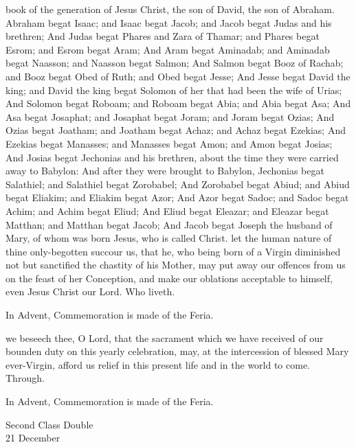  book of the generation of Jesus Christ, the son of David, the son of Abraham. Abraham begat Isaac; and Isaac begat Jacob; and Jacob begat Judas and his brethren; And Judas begat Phares and Zara of Thamar; and Phares begat Esrom; and Esrom begat Aram; And Aram begat Aminadab; and Aminadab begat Naasson; and Naasson begat Salmon; And Salmon begat Booz of Rachab; and Booz begat Obed of Ruth; and Obed begat Jesse; And Jesse begat David the king; and David the king begat Solomon of her that had been the wife of Urias; And Solomon begat Roboam; and Roboam begat Abia; and Abia begat Asa; And Asa begat Josaphat; and Josaphat begat Joram; and Joram begat Ozias; And Ozias begat Joatham; and Joatham begat Achaz; and Achaz begat Ezekias; And Ezekias begat Manasses; and Manasses begat Amon; and Amon begat Josias; And Josias begat Jechonias and his brethren, about the time they were carried away to Babylon: And after they were brought to Babylon, Jechonias begat Salathiel; and Salathiel begat Zorobabel; And Zorobabel begat Abiud; and Abiud begat Eliakim; and Eliakim begat Azor; And Azor begat Sadoc; and Sadoc begat Achim; and Achim begat Eliud; And Eliud begat Eleazar; and Eleazar begat Matthan; and Matthan begat Jacob; And Jacob begat Joseph the husband of Mary, of whom was born Jesus, who is called Christ.
\secret
{} let the human nature of thine only-begotten succour us, that he, who being born of a Virgin diminished not but sanctified the chastity of his Mother, may put away our offences from us on the feast of her Conception, and make our oblations acceptable to himself, even Jesus Christ our Lord. Who liveth.
\begin{rubric}
    In Advent, Commemoration is made of the Feria.
\end{rubric}

\postcommunion
{} we beseech thee, O Lord, that the sacrament which we have received of our bounden duty on this yearly celebration, may, at the intercession of blessed Mary ever-Virgin, afford us relief in this present life and in the world to come. Through.
\begin{rubric}
    In Advent, Commemoration is made of the Feria.
\end{rubric}

\begin{inhead}
    {Second Class Double\\
21 December}
\end{inhead}

